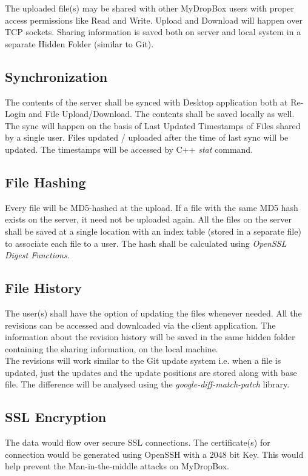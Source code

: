 \documentclass[18pt]{article}
\begin{document}
			The uploaded file(s) may be shared with other MyDropBox users with proper access permissions like Read and Write. Upload and Download will happen over TCP sockets. Sharing information is saved both on server and local system in a separate Hidden Folder (similar to Git).

		\subsection{Synchronization}
			The contents of the server shall be synced with Desktop application both at Re-Login and File Upload/Download. The contents shall be saved locally as well. The sync will happen on the basis of Last Updated Timestamps of Files shared by a single user. Files updated / uploaded after the time of last sync will be updated. The timestamps will be accessed by C++ \textit{stat} command.

		\subsection{File Hashing}
			Every file will be MD5-hashed at the upload. If a file with the same MD5 hash exists on the server, it need not be uploaded again. All the files on the server shall be saved at a single location with an index table (stored in a separate file) to associate each file to a user. The hash shall be calculated using \textit{OpenSSL Digest Functions}.

		\subsection{File History}
			The user(s) shall have the option of updating the files whenever needed. All the revisions can be accessed and downloaded via the client application. The information about the revision history will be saved in the same hidden folder containing the sharing information, on the local machine.\\
			
			The revisions will work similar to the Git update system i.e. when a file is updated, just the updates and the update positions are stored along with base file. The difference will be analysed using the \textit{google-diff-match-patch} library.

		\subsection{SSL Encryption}
			The data would flow over secure SSL connections. The certificate(s) for connection would be generated using OpenSSH with a 2048 bit Key. This would help prevent the Man-in-the-middle attacks on MyDropBox.
\end{document}
